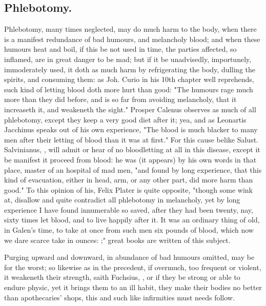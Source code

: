 \subsection{Phlebotomy.}

Phlebotomy, many times neglected, may do much harm to
the body, when there is a manifest redundance of bad humours, and melancholy
blood; and when these humours heat and boil, if this be not used in time, the
parties affected, so inflamed, are in great danger to be mad; but if it be
unadvisedly, importunely, immoderately used, it doth as much harm by
refrigerating the body, dulling the spirits, and consuming them: as Joh.
Curio in his 10th chapter well reprehends, such kind of
letting blood doth more hurt than good: "The humours rage
much more than they did before, and is so far from avoiding melancholy, that it
increaseth it, and weakeneth the sight." Prosper Calenus
observes as much of all phlebotomy, except they keep a very good diet after it;
yea, and as Leonartis Jacchinus speaks out of his own
experience, "The blood is much blacker to many men after
their letting of blood than it was at first." For this cause belike Salust.
Salvinianus, , will admit or hear of no
bloodletting at all in this disease, except it be manifest it proceed from
blood: he was (it appears) by his own words in that place, master of an
hospital of mad men, "and found by long experience, that
this kind of evacuation, either in head, arm, or any other part, did more harm
than good." To this opinion of his, Felix Plater is quite
opposite, "though some wink at, disallow and quite contradict all phlebotomy in
melancholy, yet by long experience I have found innumerable so saved, after
they had been twenty, nay, sixty times let blood, and to live happily after it.
It was an ordinary thing of old, in Galen's time, to take at once from such men
six pounds of blood, which now we dare scarce take in ounces: ;" great books are written of this subject.

Purging upward and downward, in abundance of bad humours omitted, may be for
the worst; so likewise as in the precedent, if overmuch, too frequent or
violent, it weakeneth their strength, saith Fuchsius,
, or if they be strong or able to
endure physic, yet it brings them to an ill habit, they make their bodies no
better than apothecaries' shops, this and such like infirmities must needs
follow.

